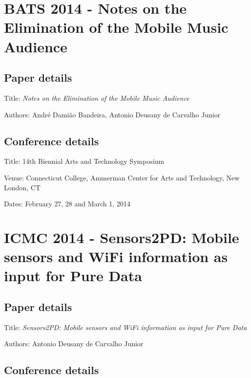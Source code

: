 

\section{BATS 2014 - Notes on the Elimination of the Mobile Music Audience}
\label{ape:paperbats2014}

\subsection*{Paper details}

Title: \textit{Notes on the Elimination of the Mobile Music Audience}

Authors: André Damião Bandeira, Antonio Deusany de Carvalho Junior

\subsection*{Conference details}

Title: 14th Biennial Arts and Technology Symposium

Venue: Connecticut College, Ammerman Center for Arts and Technology, New London, CT

Dates: February 27, 28 and March 1, 2014



\section{ICMC 2014 - Sensors2PD: Mobile sensors and WiFi information as input for Pure Data}
\label{ape:papericmc2014}

\subsection*{Paper details}

Title: \textit{Sensors2PD: Mobile sensors and WiFi information as input for Pure Data}

Authors: Antonio Deusany de Carvalho Junior

\subsection*{Conference details}

